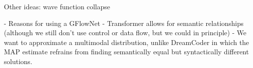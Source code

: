 Other ideas: wave function collapse



- Reasons for using a GFlowNet
- Transformer allows for semantic relationships (although we still don't use control or data flow, but we could in principle)
- We want to approximate a multimodal distribution, unlike DreamCoder in which the MAP estimate refrains from finding semantically equal but syntactically different solutions. 
